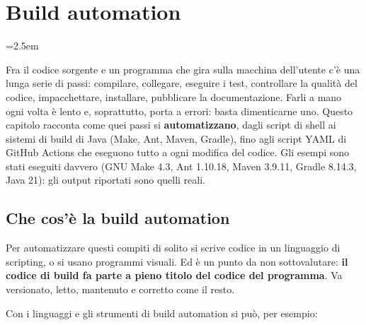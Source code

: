 \chapter{Build automation}
\emergencystretch=2.5em

Fra il codice sorgente e un programma che gira sulla macchina dell'utente c'è una lunga serie di passi: compilare,
collegare, eseguire i test, controllare la qualità del codice, impacchettare, installare, pubblicare la documentazione.
Farli a mano ogni volta è lento e, soprattutto, porta a errori: basta dimenticarne uno. Questo capitolo racconta come
quei passi si \textbf{automatizzano}, dagli script di shell ai sistemi di build di Java (Make, Ant, Maven, Gradle), fino
agli script YAML di GitHub Actions che eseguono tutto a ogni modifica del codice. Gli esempi sono stati eseguiti davvero
(GNU Make 4.3, Ant 1.10.18, Maven 3.9.11, Gradle 8.14.3, Java 21): gli output riportati sono quelli reali.


\section{Che cos'è la build automation}


Per automatizzare questi compiti di solito si scrive codice in un linguaggio di scripting, o si usano programmi
visuali. Ed è un punto da non sottovalutare: \textbf{il codice di build fa parte a pieno titolo del codice del
programma}. Va versionato, letto, mantenuto e corretto come il resto.

Con i linguaggi e gli strumenti di build automation si può, per esempio:

